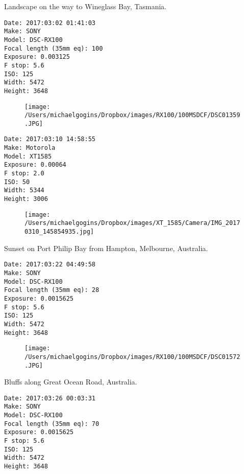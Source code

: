 \documentclass[11pt,letter,DIV=14,paper=landscape]{scrbook}
\begin{document}
\clearpage
\noindent Landscape on the way to Wineglass Bay, Tasmania.
\noindent
\begin{lstlisting}
Date: 2017:03:02 01:41:03
Make: SONY
Model: DSC-RX100
Focal length (35mm eq): 100
Exposure: 0.003125
F stop: 5.6
ISO: 125
Width: 5472
Height: 3648
\end{lstlisting}
\clearpage

\begin{figure}
\texttt{[image: /Users/michaelgogins/Dropbox/images/RX100/100MSDCF/DSC01359.JPG]}
\end{figure}
    
\clearpage
\noindent 
\noindent
\begin{lstlisting}
Date: 2017:03:10 14:58:55
Make: Motorola
Model: XT1585
Exposure: 0.00064
F stop: 2.0
ISO: 50
Width: 5344
Height: 3006
\end{lstlisting}
\clearpage

\begin{figure}
\texttt{[image: /Users/michaelgogins/Dropbox/images/XT\_1585/Camera/IMG\_20170310\_145854935.jpg]}
\end{figure}
    
\clearpage
\noindent Sunset on Port Philip Bay from Hampton, Melbourne, Australia.
\noindent
\begin{lstlisting}
Date: 2017:03:22 04:49:58
Make: SONY
Model: DSC-RX100
Focal length (35mm eq): 28
Exposure: 0.0015625
F stop: 5.6
ISO: 125
Width: 5472
Height: 3648
\end{lstlisting}
\clearpage

\begin{figure}
\texttt{[image: /Users/michaelgogins/Dropbox/images/RX100/100MSDCF/DSC01572.JPG]}
\end{figure}
    
\clearpage
\noindent Bluffs along Great Ocean Road, Australia.
\noindent
\begin{lstlisting}
Date: 2017:03:26 00:03:31
Make: SONY
Model: DSC-RX100
Focal length (35mm eq): 70
Exposure: 0.0015625
F stop: 5.6
ISO: 125
Width: 5472
Height: 3648
\end{lstlisting}
\clearpage
\end{document}

